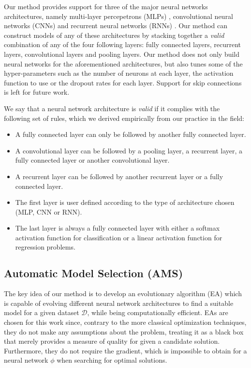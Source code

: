 \documentclass[preprint,12pt]{elsarticle}%
\begin{document}
Our method provides support for three of the major neural networks architectures, namely multi-layer percepetrons (MLPs) \cite{Engelbrecht2007}, convolutional neural networks (CNNs) \cite{imagenet_cvpr09} and recurrent neural networks (RNNs) \cite{Lipton15}. Our method can construct models of any of these architectures by stacking together a \textit{valid} combination of any of the four following layers: fully connected layers, recurrent layers, convolutional layers and pooling layers. Our method does not only build neural networks for the aforementioned architectures, but also tunes some of the hyper-parameters such as the number of neurons at each layer, the activation function to use or the dropout rates for each layer. Support for skip connections is left for future work.

We say that a neural network architecture is \textit{valid} if it complies with the following set of rules, which we derived empirically from our practice in the field:

\begin{itemize}
\item A fully connected layer can only be followed by another fully connected layer.
\item A convolutional layer can be followed by a pooling layer, a recurrent layer, a fully connected layer or another convolutional layer.
\item A recurrent layer can be followed by another recurrent layer or a fully connected layer.
\item The first layer is user defined according to the type of architecture chosen (MLP, CNN or RNN).
\item The last layer is always a fully connected layer with either a softmax activation function for classification or a linear activation function for regression problems.
\end{itemize}


\subsection{Automatic Model Selection (AMS)}

The key idea of our method is to develop an evolutionary algorithm (EA) which is capable of evolving different neural network architectures to find a suitable model for a given dataset $\mathcal{D}$, while being computationally efficient. EAs are chosen for this work since, contrary to the more classical optimization techniques, they do not make any assumptions about the problem, treating it as a black box that merely provides a measure of quality for given a candidate solution. Furthermore, they do not require the gradient, which is impossible to obtain for a neural network $\phi$ when searching for optimal solutions.
\end{document}
